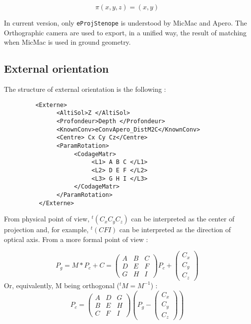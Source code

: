 \begin{equation}
    \pi(x,y,z) =  (x,y) \label{Proj:Ortho}
\end{equation}

In current version, only {\tt eProjStenope} is understood by MicMac and Apero. The Orthographic
camera are used to export, in a unified way, the result of matching when
MicMac is used in ground geometry.


\subsection{External orientation}

The structure of external orientation is the following :

\begin{verbatim}
         <Externe>
               <AltiSol>Z </AltiSol>
               <Profondeur>Depth </Profondeur>
               <KnownConv>eConvApero_DistM2C</KnownConv>
               <Centre> Cx Cy Cz</Centre>
               <ParamRotation>
                    <CodageMatr>
                         <L1> A B C </L1>
                         <L2> D E F </L2>
                         <L3> G H I </L3>
                    </CodageMatr>
               </ParamRotation>
          </Externe>
\end{verbatim}

From physical point of view,  $^t(C_x C_y C_z) $ can be interpreted
as the center of projection and, for example,  $^t(C F I)$ can be interpreted as the
direction of optical axis.
From a more formal point of view :

\begin{equation}
 P_g =  M*P_c+ C = \begin{pmatrix}A&B&C \\  D&E&F\\ G&H&I \end{pmatrix}P_c +  \begin{pmatrix} C_x \\C_y\\C_z \end{pmatrix}
\end{equation}
Or, equivalently, M being orthogonal ($^t M = M ^{-1}$) :
\begin{equation}
 P_c =  \begin{pmatrix}A&D&G \\  B&E&H\\ C&F&I \end{pmatrix} (P_g-\begin{pmatrix} C_x \\C_y\\C_z \end{pmatrix} )
\end{equation}

